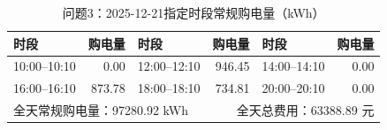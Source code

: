 \begin{table}[H]\centering\small
\caption{问题3：2025-12-21指定时段常规购电量（kWh）}
\label{tab:q3_1221_purchase}
\begin{tabular}{lrlrlr}\toprule
时段 & 购电量 & 时段 & 购电量 & 时段 & 购电量 \\\midrule
10:00--10:10 & 0.00 & 12:00--12:10 & 946.45 & 14:00--14:10 & 0.00 \\
16:00--16:10 & 873.78 & 18:00--18:10 & 734.81 & 20:00--20:10 & 0.00 \\
\midrule
\multicolumn{3}{l}{全天常规购电量：97280.92 kWh} & \multicolumn{3}{r}{全天总费用：63388.89 元}\\
\bottomrule\end{tabular}\end{table}
